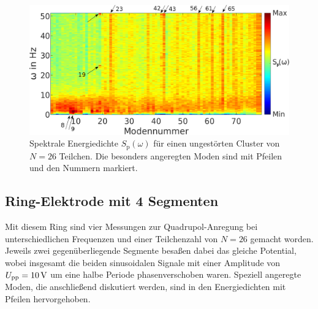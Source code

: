 \documentclass[numbers=noenddot,a4paper,notitlepage,twoside,BCOR15mm]{scrbook}
\newcommand{\ix}[1]{_\text{#1}}
\begin{document}
					\begin{figure}[!h]
						\centering
						\includegraphics[width=\textwidth]{figs/auswertung/manipulation/ersteungestpowerdens.png}
						\caption{Spektrale Energiedichte $S\ix{p}\left(\omega\right)$ für einen ungestörten Cluster von $N=26$ Teilchen. Die besonders angeregten Moden sind mit Pfeilen und den Nummern markiert.}\label{img:powerdensersteungest}
					\end{figure}

	\vspace{-0.4cm}

					\subsection*{Ring-Elektrode mit 4 Segmenten}

						Mit diesem Ring sind vier Messungen zur Quadrupol-Anregung bei unterschiedlichen Frequenzen und einer Teilchenzahl von $N=26$ gemacht worden. Jeweils zwei gegenüberliegende Segmente besaßen dabei das gleiche Potential, wobei insgesamt die beiden sinusoidalen Signale mit einer Amplitude von $U\ix{pp}=\unit[10]{V}$ um eine halbe Periode phasenverschoben waren. Speziell angeregte Moden, die anschließend diskutiert werden, sind in den Energiedichten mit Pfeilen hervorgehoben.
\end{document}
